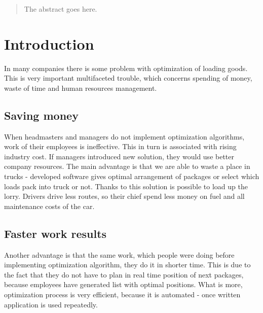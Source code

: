 \documentclass[conference,compsoc]{IEEEtran}
\begin{document}




\maketitle

\begin{abstract}
The abstract goes here.
\end{abstract}





%
\IEEEpeerreviewmaketitle



\section{Introduction}
In many companies there is some problem with optimization of loading goods. This is very important multifaceted trouble, which concerns spending of money, waste of time and human resources management.
\subsection{Saving money}
When headmasters and managers do not implement optimization algorithms, work of their employees is ineffective. This in turn is associated with rising industry cost. If managers introduced new solution, they would use better company resources. %
The main advantage is that we are able to waste a place in trucks - developed software gives optimal arrangement of packages or select which loads pack into truck or not. Thanks to this solution is possible  to load up the lorry. Drivers drive less routes, so their chief spend less money on fuel and all maintenance costs of the car.
\subsection{Faster work results}
Another advantage is that the same work, which people were doing before implementing optimization algorithm, they do it in shorter time. This is due to the fact that they do not have to plan in real time position of next packages, because employees have generated list with optimal positions. What is more, optimization process is very efficient, because it is automated - once written application is used repeatedly.
\end{document}
